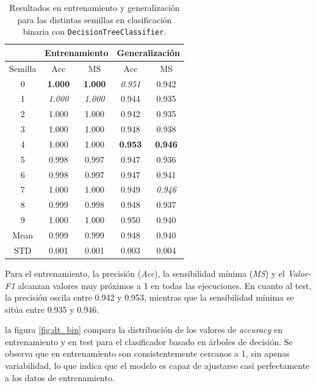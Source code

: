 \begin{table}[H]
	\centering
	\begin{tabular}{ |c|c|c|c|c| }
		\hline
		\rowcolor{LightCyan}
		 & \multicolumn{2}{c|}{Entrenamiento} & \multicolumn{2}{c|}{Generalización} \\
		\hline
		\rowcolor{LightCyan}
		Semilla & Acc & MS & Acc & MS \\
		\hline
		0    & \textbf{1.000} & \textbf{1.000} & \textit{0.951} & 0.942           \\
		1    & \textit{1.000} & \textit{1.000} & 0.944          & 0.935           \\
		2    & 1.000          & 1.000          & 0.942          & 0.935           \\
		3    & 1.000          & 1.000          & 0.948          & 0.938           \\
		4    & 1.000          & 1.000          & \textbf{0.953} & \textbf{0.946}  \\
		5    & 0.998          & 0.997          & 0.947          & 0.936           \\
		6    & 0.998          & 0.997          & 0.947          & 0.941           \\
		7    & 1.000          & 1.000          & 0.949          & \textit{0.946}  \\
		8    & 0.999          & 0.998          & 0.948          & 0.937           \\
		9    & 1.000          & 1.000          & 0.950          & 0.940           \\
		Mean & 0.999          & 0.999          & 0.948          & 0.940           \\
		STD  & 0.001          & 0.001          & 0.003          & 0.004           \\
		\hline
	\end{tabular}
	\caption{Resultados en entrenamiento y generalización para las distintas semillas en clasificación binaria con \texttt{DecisionTreeClassifier}.}
	\label{tabla:dt_bin}
\end{table}

Para el entrenamiento, la precisión (\textit{Acc}), la sensibilidad mínima (\textit{MS}) y el \textit{Valor-F1} alcanzan valores muy próximos a 1 en todas las ejecuciones. En cuanto al test, la precisión oscila entre 0.942 y 0.953, mientras que la sensibilidad mínima se sitúa entre 0.935 y 0.946.

\vspace{1em}

la figura \ref{fig:dt_bin} compara la distribución de los valores de \textit{accuracy} en entrenamiento y en test para el clasificador basado en árboles de decisión. Se observa que en entrenamiento son consistentemente cercanos a 1, sin apenas variabilidad, lo que indica que el modelo es capaz de ajustarse casi perfectamente a los datos de entrenamiento.

